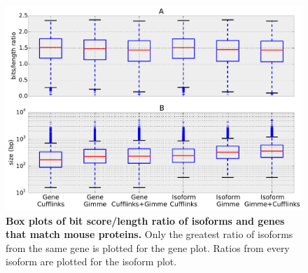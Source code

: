 \documentclass[10pt]{article}
\begin{document}

\begin{figure}[!ht]
\begin{center}
\includegraphics[width=5in]{mouse-homolog-boxplot.pdf}
\end{center}
\caption{
{\bf Box plots of bit score/length ratio of isoforms and genes that match mouse
proteins.} Only the greatest ratio of isoforms from the same gene is plotted for
the gene plot. Ratios from every isoform are plotted for the isoform plot.}
\label{bitscore}
\end{figure}

% 
\end{document}
